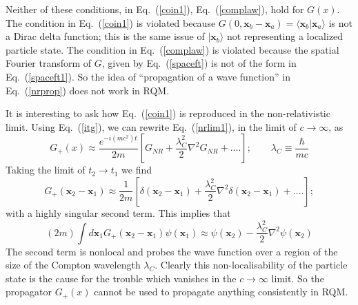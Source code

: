 \documentclass[12pt]{article}
\def\eq#1{{Eq.~(\ref{#1})}}
\def\ket#1{|#1\rangle}                    %
\def\amp#1#2{\langle #1 | #2\rangle}      %
\begin{document}
 Neither of these conditions, in \eq{coin1}, \eq{complaw}, hold for $G(x)$. The  condition in \eq{coin1} is violated because $G(0,\bm{x}_b-\bm{x}_a)=\amp{\bm{x}_b}{\bm{x}_a}$ is not a Dirac delta function; this is the same issue of $\ket{\bm{x}_b}$ not representing a localized particle state. 
 The  condition in \eq{complaw} is violated because the spatial Fourier transform of $G$, given by \eq{spaceft} is not of the form in \eq{spaceft1}. So the idea of ``propagation of a wave function'' in \eq{nrprop} does not work in RQM.
 
 It is interesting to ask how \eq{coin1} is reproduced in the non-relativistic limit. 
 Using \eq{itg}, we can rewrite \eq{nrlim1}, in the limit of $c\to\infty$, as
 \begin{equation}
 G_+(x)\approx\frac{e^{-i(mc^2)t}}{2m}\left[G_{NR}+\frac{\lambda_C^2}{2}\nabla^2 G_{NR}+ ....\right];
 \qquad \lambda_C\equiv\frac{\hbar}{mc}
 \label{nrlim2}
\end{equation} 
Taking the limit of $t_2\to t_1$ we find
\begin{equation}
G_+(\bm{x}_2-\bm{x}_1)\approx\frac{1}{2m}\left[\delta(\bm{x}_2-\bm{x}_1)+\frac{\lambda_C^2}{2}\nabla^2\delta(\bm{x}_2-\bm{x}_1) + ....\right];
 \label{nrlim3}
\end{equation} 
with a highly singular second term. This implies that
\begin{equation}
 (2m)\int d\bm{x}_1G_+(\bm{x}_2-\bm{x}_1)\psi(\bm{x}_1)\approx\psi(\bm{x}_2)-\frac{\lambda_C^2}{2}\nabla^2\psi(\bm{x}_2)
\end{equation} 
The second term is nonlocal and probes the wave function over a region of the size of the Compton wavelength $\lambda_C$. Clearly this non-localisability of the particle state is the cause for the trouble which vanishes in the $c\to\infty$ limit. So the propagator $G_+(x)$ cannot be used to propagate anything consistently in RQM.
 
\end{document}

